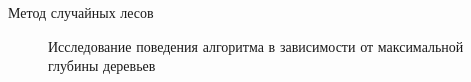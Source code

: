 \documentclass[12pt]{article}
\begin{document}
\begin{section}{Метод случайных лесов}
\begin{figure}[h]
\begin{minipage}[h]{0.5\linewidth}
\end{minipage}
\caption{Исследование поведения алгоритма в зависимости от максимальной глубины деревьев}
\label{ris:image1}
\end{figure}




\end{section}
\end{document}
